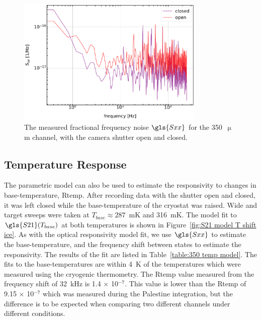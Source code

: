 \begin{figure}[!htbp]
\centering
\includegraphics[width=0.8\textwidth]{figures/blast_data/sweeps/350_model_psds}
\caption[~Fractional frequency noise for the camera shutter open and closed.]{The measured fractional frequency noise $\gls{Sxx}$ for the 350~$\upmu$m channel, with the camera shutter open and closed.}
\label{fig:350 chan psd}
\end{figure}


\subsection{Temperature Response}

The parametric model can also be used to estimate the responsivity to changes in base-temperature, \gls{Rtemp}. After recording data with the shutter open and closed, it was left closed while the base-temperature of the cryostat was raised. Wide and target sweeps were taken at $T_{base} \approx 287$~mK and 316~mK. The model fit to $\gls{S21}(T_{base})$ at both temperatures is shown in Figure~\ref{fig:S21 model T shift ice}. As with the optical responsivity model fit, we use $\gls{Sxx}$ to estimate the base-temperature, and the frequency shift between states to estimate the responsivity. The results of the fit are listed in Table~\ref{table:350 temp model}. The fits to the base-temperatures are within 4~K of the temperatures which were measured using the cryogenic thermometry. The \gls{Rtemp} value measured from the frequency shift of 32~kHz is 1.4 $\times$ 10$^{-7}$. This value is lower than the \gls{Rtemp} of 9.15 $\times$ 10$^{-7}$ which was measured during the Palestine integration, but the difference is to be expected when comparing two different channels under different conditions.

